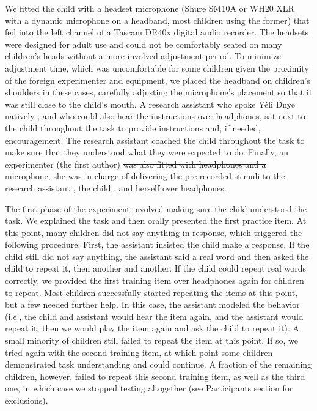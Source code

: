 \documentclass[english,,man,floatsintext]{apa6} %
\providecommand{\DIFaddtex}[1]{{\protect\color{blue}\uwave{#1}}} %
\providecommand{\DIFdeltex}[1]{{\protect\color{red}\sout{#1}}}                      %
\providecommand{\DIFaddbegin}{} %
\providecommand{\DIFaddend}{} %
\providecommand{\DIFdelbegin}{} %
\providecommand{\DIFdelend}{} %
\providecommand{\DIFadd}[1]{\texorpdfstring{\DIFaddtex{#1}}{#1}} %
\providecommand{\DIFdel}[1]{\texorpdfstring{\DIFdeltex{#1}}{}} %
\newcommand{\DIFscaledelfig}{0.5}
\newlength{\DIFdelgraphicswidth} %
\newlength{\DIFdelgraphicsheight} %
\newcommand{\DIFaddincludegraphics}[2][]{{\color{blue}\fbox{\DIFOincludegraphics[#1]{#2}}}} %
\newcommand{\DIFdelincludegraphics}[2][]{%
	\sbox{\DIFdelgraphicsbox}{\DIFOincludegraphics[#1]{#2}}%
	\settoboxwidth{\DIFdelgraphicswidth}{\DIFdelgraphicsbox} %
	\settoboxtotalheight{\DIFdelgraphicsheight}{\DIFdelgraphicsbox} %
	\scalebox{\DIFscaledelfig}{%
		\parbox[b]{\DIFdelgraphicswidth}{\usebox{\DIFdelgraphicsbox}\\[-\baselineskip] \rule{\DIFdelgraphicswidth}{0em}}\llap{\resizebox{\DIFdelgraphicswidth}{\DIFdelgraphicsheight}{%
				\setlength{\unitlength}{\DIFdelgraphicswidth}%
				\begin{picture}(1,1)%
				\thicklines\linethickness{2pt} %
				{\color[rgb]{1,0,0}\put(0,0){\framebox(1,1){}}}%
				{\color[rgb]{1,0,0}\put(0,0){\line( 1,1){1}}}%
				{\color[rgb]{1,0,0}\put(0,1){\line(1,-1){1}}}%
				\end{picture}%
			}\hspace*{3pt}}} %
} %
\DeclareRobustCommand{\DIFaddbegin}{\DIFOaddbegin \let\includegraphics\DIFaddincludegraphics} %
\DeclareRobustCommand{\DIFaddend}{\DIFOaddend \let\includegraphics\DIFOincludegraphics} %
\DeclareRobustCommand{\DIFdelbegin}{\DIFOdelbegin \let\includegraphics\DIFdelincludegraphics} %
\DeclareRobustCommand{\DIFdelend}{\DIFOaddend \let\includegraphics\DIFOincludegraphics} %
\begin{document}
We fitted the child with a headset microphone (Shure SM10A or WH20 XLR with a dynamic microphone on a headband, most children using the former) that fed into the left channel of a Tascam DR40x digital audio recorder. The headsets were designed for adult use and could not be comfortably seated on many children's heads without a more involved adjustment period. To minimize adjustment time, which was uncomfortable for some children given the proximity of the foreign experimenter and equipment, we placed the headband on children's shoulders in these cases, carefully adjusting the microphone's placement so that it was still close to the child's mouth. A research assistant who spoke Yélî Dnye natively \DIFdelbegin \DIFdel{, and who could also hear the instructions over headphones, }\DIFdelend sat next to the child throughout the task to provide instructions and, if needed, encouragement. The research assistant coached the child throughout the task to make sure that they understood what they were expected to do. \DIFdelbegin \DIFdel{Finally, an }\DIFdelend \DIFaddbegin \DIFadd{An }\DIFaddend experimenter (the first author) \DIFdelbegin \DIFdel{was also fitted with headphones and a microphone; she was in charge of delivering }\DIFdelend \DIFaddbegin \DIFadd{delivered }\DIFaddend the pre-recorded stimuli to the research assistant \DIFdelbegin \DIFdel{, the child , and herself }\DIFdelend \DIFaddbegin \DIFadd{and the child }\DIFaddend over headphones.

The first phase of the experiment involved making sure the child understood the task. We explained the task and then orally presented the first practice item. At this point, many children did not say anything in response, which triggered the following procedure: First, the assistant insisted the child make a response. If the child still did not say anything, the assistant said a real word and then asked the child to repeat it, then another and another. If the child could repeat real words correctly, we provided the first training item over headphones again for children to repeat. Most children successfully started repeating the items at this point, but a few needed further help. In this case, the assistant modeled the behavior (i.e., the child and assistant would hear the item again, and the assistant would repeat it; then we would play the item again and ask the child to repeat it). A small minority of children still failed to repeat the item at this point. If so, we tried again with the second training item, at which point some children demonstrated task understanding and could continue. A fraction of the remaining children, however, failed to repeat this second training item, as well as the third one, in which case we stopped testing altogether (see Participants section for exclusions).
\end{document}
